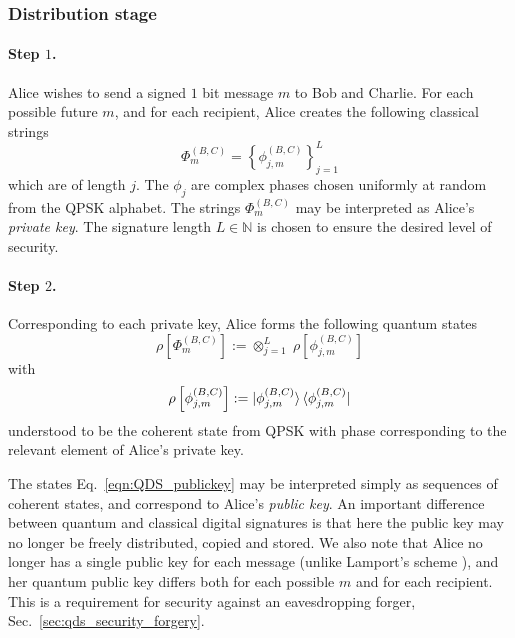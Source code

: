 \subsubsection{Distribution stage}

\paragraph{Step $1$.}
Alice wishes to send a signed $1$ bit message $m$ to Bob and Charlie. For each possible future $m$, and for each recipient, Alice creates the following classical strings
\begin{equation}
\Phi_m^{\left(B, C\right)} = \left\{ \phi_{j, m}^{\left(B, C\right)}\right\}_{j=1}^{L}
\end{equation}
which are of length $j$. The $\phi_{j}$ are complex phases chosen uniformly at random from the QPSK alphabet. The strings $\Phi_m^{\left(B, C\right)}$ may be interpreted as Alice's \emph{private key}. The signature length $L \in \mathbb{N}$ is chosen to ensure the desired level of security.

\paragraph{Step $2$.} Corresponding to each private key, Alice forms the following quantum states
\begin{equation}\label{eqn:QDS_publickey}
\rho\left[\Phi_m^{\left(B, C\right)}\right] := \otimes_{j=1}^L \; \rho\left[\phi_{j, m}^{\left(B, C\right)}\right]
\end{equation}
with
\begin{equation}
\rho\left[\phi_{j, m}^{\left(B, C\right)}\right] := \ket{\phi_{j, m}^{\left(B, C\right)}} \bra{\phi_{j, m}^{\left(B, C\right)}} \notag
\end{equation}
understood to be the coherent state from QPSK with phase corresponding to the relevant element of Alice's private key.

The states Eq.~\ref{eqn:QDS_publickey} may be interpreted simply as sequences of coherent states, and correspond to Alice's \emph{public key}. An important difference between quantum and classical digital signatures is that here the public key may no longer be freely distributed, copied and stored. We also note that Alice no longer has a single public key for each message (unlike Lamport's scheme \cite{Lamport}), and her quantum public key differs both for each possible $m$ and for each recipient. This is a requirement for security against an eavesdropping forger, Sec.~\ref{sec:qds_security_forgery}.

